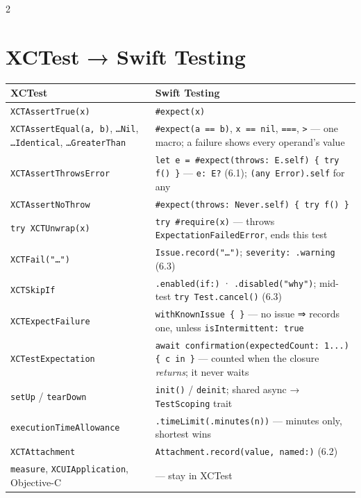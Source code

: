 \documentclass[8pt]{extarticle}
\newcommand\ct[1]{\texttt{#1}}
\begin{document}
\begin{multicols}{2}
\section{XCTest → Swift Testing}
{\scriptsize\setlength{\tabcolsep}{2pt}
\begin{tabular}{@{}>{\raggedright\arraybackslash}p{24mm}>{\raggedright\arraybackslash}p{50mm}@{}}
\toprule
\textbf{XCTest} & \textbf{Swift Testing}\\
\midrule
\ct{XCTAssertTrue(x)} & \ct{\#expect(x)}\\
\ct{XCTAssertEqual(a, b)}, \ct{…Nil}, \ct{…Identical}, \ct{…GreaterThan} & \ct{\#expect(a == b)}, \ct{x == nil}, \ct{===}, \ct{>} — one macro; a failure shows every operand's value\\
\ct{XCTAssertThrowsError} & \ct{let e = \#expect(throws: E.self) \{ try f() \}} — \ct{e: E?} (6.1); \ct{(any Error).self} for any\\
\ct{XCTAssertNoThrow} & \ct{\#expect(throws: Never.self) \{ try f() \}}\\
\ct{try XCTUnwrap(x)} & \ct{try \#require(x)} — throws \ct{ExpectationFailedError}, ends this test\\
\ct{XCTFail("…")} & \ct{Issue.record("…")}; \ct{severity: .warning} (6.3)\\
\ct{XCTSkipIf} & \ct{.enabled(if:)} · \ct{.disabled("why")}; mid-test \ct{try Test.cancel()} (6.3)\\
\ct{XCTExpectFailure} & \ct{withKnownIssue \{ \}} — no issue ⇒ records one, unless \ct{isIntermittent: true}\\
\ct{XCTestExpectation} & \ct{await confirmation(expectedCount: 1...) \{ c in \}} — counted when the closure \emph{returns}; it never waits\\
\ct{setUp} / \ct{tearDown} & \ct{init()} / \ct{deinit}; shared async → \ct{TestScoping} trait\\
\ct{executionTimeAllowance} & \ct{.timeLimit(.minutes(n))} — minutes only, shortest wins\\
\ct{XCTAttachment} & \ct{Attachment.record(value, named:)} (6.2)\\
\ct{measure}, \ct{XCUIApplication}, Objective-C & — stay in XCTest\\
\bottomrule
\end{tabular}}


\end{multicols}
\end{document}

